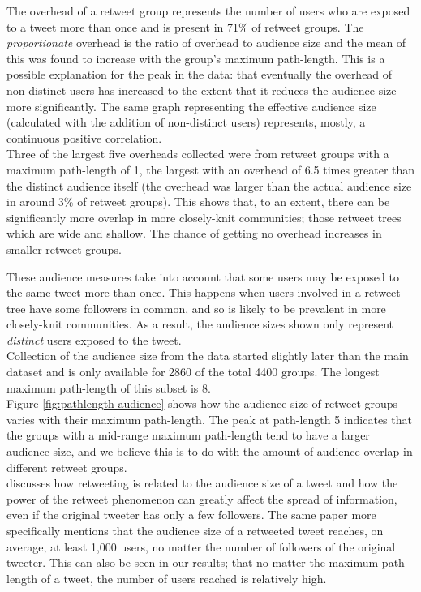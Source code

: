The overhead of a retweet group represents the number of users who are exposed to a tweet more than once and is present in 71\% of retweet groups. The \textit{proportionate} overhead is the ratio of overhead to audience size and the mean of this was found to increase with the group's maximum path-length. This is a possible explanation for the peak in the data: that eventually the overhead of non-distinct users has increased to the extent that it reduces the audience size more significantly. The same graph representing the effective audience size (calculated with the addition of non-distinct users) represents, mostly, a continuous positive correlation.\\
Three of the largest five overheads collected were from retweet groups with a maximum path-length of 1, the largest with an overhead of 6.5 times greater than the distinct audience itself (the overhead was larger than the actual audience size in around 3\% of retweet groups). This shows that, to an extent, there can be significantly more overlap in more closely-knit communities; those retweet trees which are wide and shallow. The chance of getting no overhead increases in smaller retweet groups.

These audience measures take into account that some users may be exposed to the same tweet more than once. This happens when users involved in a retweet tree have some followers in common, and so is likely to be prevalent in more closely-knit communities. As a result, the audience sizes shown only represent \textit{distinct} users exposed to the tweet.\\
Collection of the audience size from the data started slightly later than the main dataset and is only available for 2860 of the total 4400 groups. The longest maximum path-length of this subset is 8.\\
Figure \ref{fig:pathlength-audience} shows how the audience size of retweet groups varies with their maximum path-length. The peak at path-length 5 indicates that the groups with a mid-range maximum path-length tend to have a larger audience size, and we believe this is to do with the amount of audience overlap in different retweet groups.\\
\cite{kwak10} discusses how retweeting is related to the audience size of a tweet and how the power of the retweet phenomenon can greatly affect the spread of information, even if the original tweeter has only a few followers. The same paper more specifically mentions that the audience size of a retweeted tweet reaches, on average, at least 1,000 users, no matter the number of followers of the original tweeter. This can also be seen in our results; that no matter the maximum path-length of a tweet, the number of users reached is relatively high.\\
